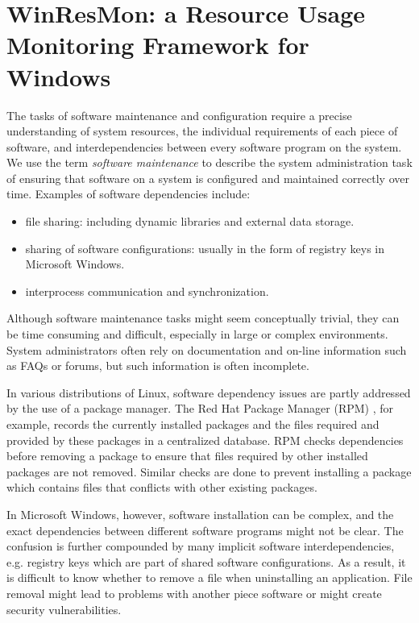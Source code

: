 \section{WinResMon: a Resource Usage Monitoring Framework for Windows}
\label{sec:winresmon}


The tasks of software maintenance and configuration require a precise
understanding of system resources, the individual requirements of each piece
of software, and interdependencies between every software program on the
system.  We use the term {\em software maintenance} to describe the system
administration task of ensuring that software on a system is configured and
maintained correctly over time.  Examples of software dependencies include:

\begin{itemize}
\item file sharing: including dynamic libraries and external data storage.
\item sharing of software configurations: usually in the form of registry keys
in Microsoft Windows.
\item interprocess communication and synchronization.
\end{itemize}

Although software maintenance tasks might seem conceptually trivial, they can
be time consuming and difficult, especially in large or complex environments.
System administrators often rely on documentation and on-line information such
as FAQs or forums, but such information is often incomplete.

In various distributions of Linux, software dependency issues are partly
addressed by the use of a package manager.  The Red Hat Package Manager (RPM)
\cite{ewing1996rpm}, for example, records the currently installed packages and the
files required and provided by these packages in a centralized database.  RPM
checks dependencies before removing a package to ensure that files required by
other installed packages are not removed.  Similar checks are done to prevent
installing a package which contains files that conflicts with other existing
packages.

In Microsoft Windows, however, software installation can be complex, and the
exact dependencies between different software programs might not be clear.
The confusion is further compounded by many implicit software
interdependencies, e.g. registry keys which are part of shared software
configurations.  As a result, it is difficult to know whether to remove a file
when uninstalling an application.  File removal might lead to problems with
another piece software or might create security vulnerabilities.  


